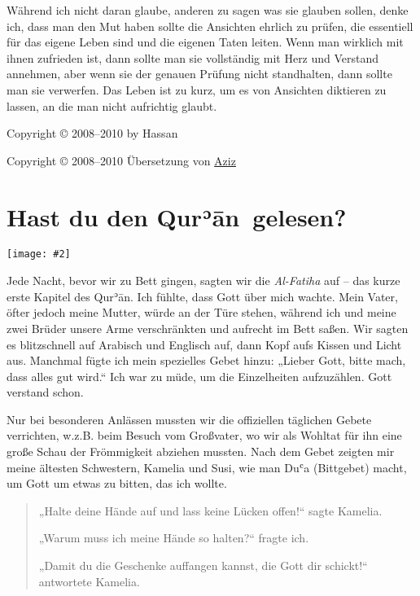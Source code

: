 \documentclass[12pt]{memoir}
\def\´{ʾ} %
\def\`{ʿ} %
\def \Quran{Qur\-\´ān} %
\newcommand{\img}[3]{\begin{center}%
\texttt{[image: \#2]}\\{\small\em#3}%
\end{center}}
\begin{document}
Während ich nicht daran glaube, anderen zu sagen was sie glauben sollen,
denke ich, dass man den Mut haben sollte die Ansichten ehrlich zu prüfen,
die essentiell für das eigene Leben sind und die eigenen Taten leiten.
Wenn man wirklich mit ihnen zufrieden ist,
dann sollte man sie vollständig mit Herz und Verstand annehmen,
aber wenn sie der genauen Prüfung nicht standhalten,
dann sollte man sie verwerfen.
Das Leben ist zu kurz, um es von Ansichten diktieren zu lassen,
an die man nicht aufrichtig glaubt.

\hfill Copyright © 2008–2010 by Hassan

\hfill Copyright © 2008–2010 Übersetzung von
\href{mailto:alsana.aziz@gmail.com}{Aziz}

\mainmatter


\chapter{Hast du den \Quran\ gelesen?}

\img{scale=0.7}{Baby_Hassan.jpg}{}

Jede Nacht, bevor wir zu Bett gingen, sagten wir die \emph{Al-Fatiha} auf –
das kurze erste Kapitel des \Quran.
Ich fühlte, dass Gott über mich wachte.
Mein Vater, öfter jedoch meine Mutter, würde an der Türe stehen,
während ich und meine zwei Brüder unsere Arme verschränkten
und aufrecht im Bett saßen.
Wir sagten es blitzschnell auf Arabisch und Englisch auf,
dann Kopf aufs Kissen und Licht aus.
Manchmal fügte ich mein spezielles Gebet hinzu:
„Lieber Gott, bitte mach, dass alles gut wird.“
Ich war zu müde, um die Einzelheiten aufzuzählen.
Gott verstand schon.

Nur bei besonderen Anlässen mussten wir
die offiziellen täglichen Gebete verrichten,
w.z.B. beim Besuch vom Großvater,
wo wir als Wohltat für ihn eine große Schau der Frömmigkeit abziehen mussten.
Nach dem Gebet zeigten mir meine ältesten Schwestern, Kamelia und Susi,
wie man Du\`a (Bittgebet) macht, um Gott um etwas zu bitten, das ich wollte.

\begin{quote}
„Halte deine Hände auf und lass keine Lücken offen!“ sagte Kamelia.

„Warum muss ich meine Hände so halten?“ fragte ich.

„Damit du die Geschenke auffangen kannst, die Gott dir schickt!“
antwortete Kamelia.
\end{quote}
\end{document}
